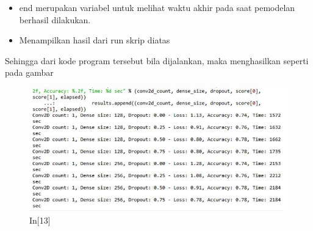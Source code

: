 \begin{enumerate}
\begin{itemize}
\item end merupakan variabel untuk melihat waktu akhir pada saat pemodelan berhasil dilakukan.
\item Menampilkan hasil dari run skrip diatas
\end{itemize}
\par Sehingga dari kode program tersebut bila dijalankan, maka menghasilkan seperti pada gambar 
\begin{figure}[!htbp]
	\centerline{\includegraphics[width=1\textwidth]{figures/andi/p13.PNG}}
	\caption{In[13]}
	

\end{figure}
\end{enumerate}
